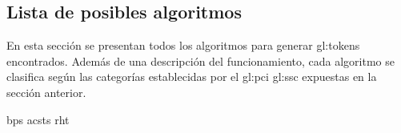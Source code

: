 %
%

\subsection{Lista de posibles algoritmos}

En esta sección se presentan todos los algoritmos para generar
\glspl{gl:token} encontrados. Además de una descripción del funcionamiento,
cada algoritmo se clasifica según las categorías establecidas por el
\gls{gl:pci} \gls{gl:ssc} expuestas en la sección anterior.

{bps}
{acsts}
{rht}
